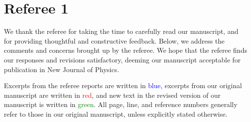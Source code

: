 \documentclass[preprint]{revtex4-1}
\newcommand{\1}{\mathds{1}}
\newcommand{\blue}[1]{\textcolor{blue}{#1}}
\newcommand{\red}[1]{\textcolor{red}{#1}}
\newcommand{\green}[1]{\textcolor{green}{#1}}
\begin{document}
\section*{Referee 1}

We thank the referee for taking the time to carefully read our
manuscript, and for providing thoughtful and constructive feedback.
Below, we address the comments and concerns brought up by the referee.
We hope that the referee finds our responses and revisions
satisfactory, deeming our manuscript acceptable for publication in New
Journal of Physics.

Excerpts from the referee reports are written in \blue{blue}, excerpts
from our original manuscript are written in \red{red}, and new text in
the revised version of our manuscript is written in \green{green}.
All page, line, and reference numbers generally refer to those in our
original manuscript, unless explicitly stated otherwise.
\end{document}
